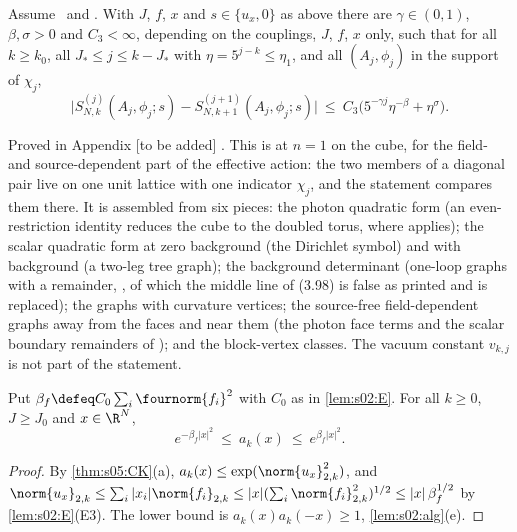 \begin{proposition}\label{prop:k01:Kpos}
Assume \BALint\ and \RENorb. With $J$, $f$, $x$ and $s\in\{u_x,0\}$ as above there are $\gamma\in(0,1)$, $\beta,\sigma>0$ and $C_3<\infty$, depending on the couplings, $J$, $f$, $x$ only, such that for all $k\ge k_0$, all $J_*\le j\le k-J_*$ with $\eta=5^{j-k}\le\eta_1$, and all $(A_j,\phi_j)$ in the support of $\chi_j$,
\begin{equation}\label{eq:k01:Kpos}
\big|S^{(j)}_{N,k}(A_j,\phi_j;s)-S^{(j+1)}_{N,k+1}(A_j,\phi_j;s)\big|\ \le\ C_3\big(5^{-\gamma j}\eta^{-\beta}+\eta^{\sigma}\big).
\end{equation}
\end{proposition}
Proved in Appendix [to be added] . This is \cite[Thm.~3.4]{K1} at $n=1$ on the cube, for the field- and source-dependent part of the effective action: the two members of a diagonal pair live on one unit lattice with one indicator $\chi_j$, and the statement compares them there. It is assembled from six pieces: the photon quadratic form (an even-restriction identity reduces the cube to the doubled torus, where \cite[Prop.~3.10]{K1} applies); the scalar quadratic form at zero background (the Dirichlet symbol) and with background (a two-leg tree graph); the background determinant (one-loop graphs with a remainder, \cite[(3.94)--(3.98)]{K1}, of which the middle line of (3.98) is false as printed and is replaced); the graphs with curvature vertices; the source-free field-dependent graphs away from the faces and near them (the photon face terms and the scalar boundary remainders of \cite[pp.~331--332]{K2}); and the block-vertex classes. The vacuum constant $v_{k,j}$ is not part of the statement.

\begin{lemma}\label{lem:k01:free}
Put $\beta_f\defeq C_0\sum_i\fournorm{f_i}^2$ with $C_0$ as in \cref{lem:s02:E}. For all $k\ge0$, $J\ge J_0$ and $x\in\R^N$,
\[
e^{-\beta_f|x|^2}\ \le\ a_k(x)\ \le\ e^{\beta_f|x|^2}.
\]
\end{lemma}
\begin{proof}
By \cref{thm:s05:CK}(a), $a_k(x)\le\exp(\norm{u_x}^2_{2,k})$, and $\norm{u_x}_{2,k}\le\sum_i|x_i|\norm{f_i}_{2,k}\le|x|(\sum_i\norm{f_i}^2_{2,k})^{1/2}\le|x|\,\beta_f^{1/2}$ by \cref{lem:s02:E}(E3). The lower bound is $a_k(x)a_k(-x)\ge1$, \cref{lem:s02:alg}(e).
\end{proof}


